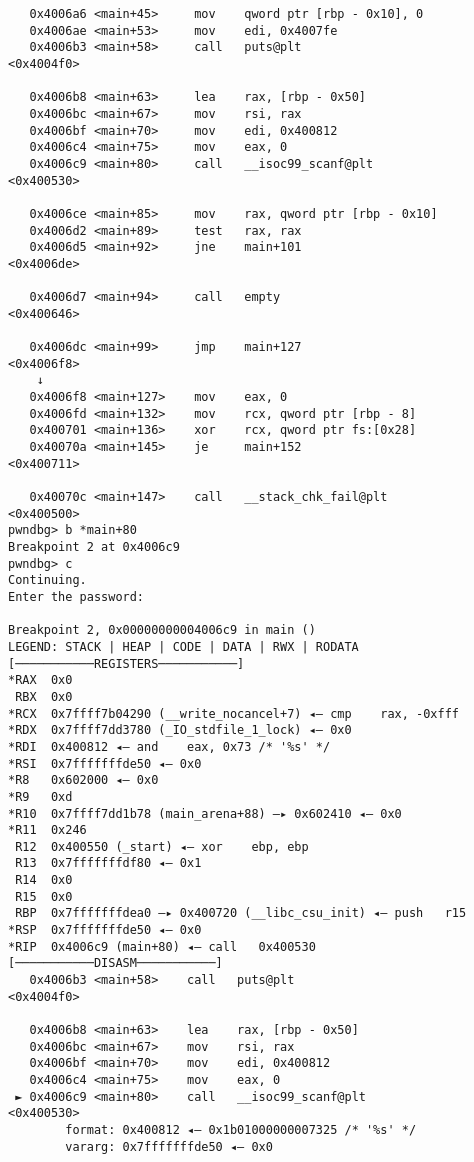 \documentclass{article}
\begin{document}
\begin{lstlisting}
   0x4006a6 <main+45>     mov    qword ptr [rbp - 0x10], 0
   0x4006ae <main+53>     mov    edi, 0x4007fe
   0x4006b3 <main+58>     call   puts@plt                      <0x4004f0>
 
   0x4006b8 <main+63>     lea    rax, [rbp - 0x50]
   0x4006bc <main+67>     mov    rsi, rax
   0x4006bf <main+70>     mov    edi, 0x400812
   0x4006c4 <main+75>     mov    eax, 0
   0x4006c9 <main+80>     call   __isoc99_scanf@plt            <0x400530>
 
   0x4006ce <main+85>     mov    rax, qword ptr [rbp - 0x10]
   0x4006d2 <main+89>     test   rax, rax
   0x4006d5 <main+92>     jne    main+101                      <0x4006de>
 
   0x4006d7 <main+94>     call   empty                         <0x400646>
 
   0x4006dc <main+99>     jmp    main+127                      <0x4006f8>
    ↓
   0x4006f8 <main+127>    mov    eax, 0
   0x4006fd <main+132>    mov    rcx, qword ptr [rbp - 8]
   0x400701 <main+136>    xor    rcx, qword ptr fs:[0x28]
   0x40070a <main+145>    je     main+152                      <0x400711>
 
   0x40070c <main+147>    call   __stack_chk_fail@plt          <0x400500>
pwndbg> b *main+80
Breakpoint 2 at 0x4006c9
pwndbg> c
Continuing.
Enter the password:

Breakpoint 2, 0x00000000004006c9 in main ()
LEGEND: STACK | HEAP | CODE | DATA | RWX | RODATA
[───────────REGISTERS───────────]
*RAX  0x0
 RBX  0x0
*RCX  0x7ffff7b04290 (__write_nocancel+7) ◂— cmp    rax, -0xfff
*RDX  0x7ffff7dd3780 (_IO_stdfile_1_lock) ◂— 0x0
*RDI  0x400812 ◂— and    eax, 0x73 /* '%s' */
*RSI  0x7fffffffde50 ◂— 0x0
*R8   0x602000 ◂— 0x0
*R9   0xd
*R10  0x7ffff7dd1b78 (main_arena+88) —▸ 0x602410 ◂— 0x0
*R11  0x246
 R12  0x400550 (_start) ◂— xor    ebp, ebp
 R13  0x7fffffffdf80 ◂— 0x1
 R14  0x0
 R15  0x0
 RBP  0x7fffffffdea0 —▸ 0x400720 (__libc_csu_init) ◂— push   r15
*RSP  0x7fffffffde50 ◂— 0x0
*RIP  0x4006c9 (main+80) ◂— call   0x400530
[───────────DISASM───────────]
   0x4006b3 <main+58>    call   puts@plt                      <0x4004f0>
 
   0x4006b8 <main+63>    lea    rax, [rbp - 0x50]
   0x4006bc <main+67>    mov    rsi, rax
   0x4006bf <main+70>    mov    edi, 0x400812
   0x4006c4 <main+75>    mov    eax, 0
 ► 0x4006c9 <main+80>    call   __isoc99_scanf@plt            <0x400530>
        format: 0x400812 ◂— 0x1b01000000007325 /* '%s' */
        vararg: 0x7fffffffde50 ◂— 0x0
 

\end{lstlisting}
\end{document}
